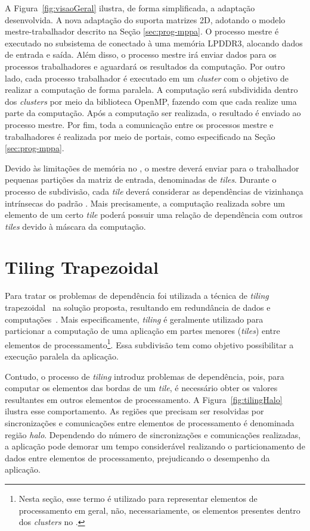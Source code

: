 A Figura~\ref{fig:visaoGeral} ilustra, de forma simplificada, a adaptação
desenvolvida. A nova adaptação do \fw suporta matrizes 2D, adotando o modelo
mestre-trabalhador descrito na Seção \ref{sec:prog-mppa}. O processo mestre é
executado no subsistema de \es conectado à uma memória LPDDR3, alocando dados de
entrada e saída. Além disso, o processo mestre irá enviar dados para os processos
trabalhadores e aguardará os resultados da computação. Por outro lado, cada processo
trabalhador é executado em um \textit{cluster} com o objetivo de realizar a
computação \stencil de forma paralela. A computação será subdividida dentro dos
\textit{clusters} por meio da biblioteca OpenMP, fazendo com que cada \pe realize uma parte
da computação. Após a computação ser realizada, o resultado é enviado ao
processo mestre. Por fim, toda a comunicação entre os processos mestre e trabalhadores é
realizada por meio de portais, como especificado na Seção \ref{sec:prog-mppa}.

Devido às limitações de memória no \mppa, o mestre deverá enviar para o
trabalhador pequenas partições da matriz de entrada, denominadas de
\textit{tiles}. Durante o processo de subdivisão, cada \textit{tile} deverá
considerar as dependências de vizinhança intrínsecas do padrão \stencil. Mais
precisamente, a computação realizada sobre um elemento de um certo \textit{tile}
poderá possuir uma relação de dependência com outros \textit{tiles} devido à
máscara da computação.


\section{Tiling Trapezoidal}
\label{sec:tiling}
Para tratar os problemas de dependência foi utilizada a técnica de
\textit{tiling} trapezoidal~\cite{meng11} na solução proposta, resultando em redundância de
dados e computações~\cite{rocha17}. Mais especificamente, \textit{tiling} é
geralmente utilizado para particionar a computação de uma aplicação \stencil em
partes menores (\textit{tiles}) entre elementos de processamento\footnote{Nesta
seção, esse termo é utilizado para representar elementos de processamento em
geral, não, necessariamente, os elementos presentes dentro dos \textit{clusters}
no \mppa.}. Essa subdivisão tem como objetivo possibilitar a execução paralela da aplicação.

Contudo, o processo de \textit{tiling} introduz problemas de dependência, pois,
para computar os elementos das bordas de um \textit{tile}, é necessário obter
os valores resultantes em outros elementos de processamento. A Figura~\ref{fig:tilingHalo} ilustra
esse comportamento. As regiões que precisam ser resolvidas por sincronizações e
comunicações entre elementos de processamento é denominada região \textit{halo}. Dependendo do número
de sincronizações e comunicações realizadas, a aplicação pode demorar um tempo
considerável realizando o particionamento de dados entre elementos de
processamento, prejudicando o desempenho da aplicação.

